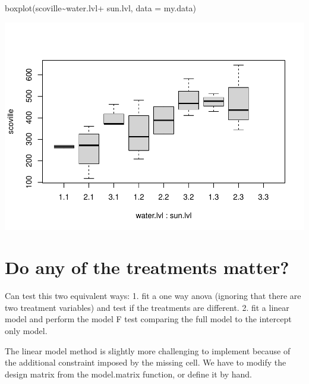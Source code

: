 \documentclass[
]{book}
\newenvironment{Shaded}{\begin{snugshade}}{\end{snugshade}}
\newcommand{\AttributeTok}[1]{\textcolor[rgb]{0.77,0.63,0.00}{#1}}
\newcommand{\FunctionTok}[1]{\textcolor[rgb]{0.00,0.00,0.00}{#1}}
\newcommand{\NormalTok}[1]{#1}
\newcommand{\SpecialCharTok}[1]{\textcolor[rgb]{0.00,0.00,0.00}{#1}}
\begin{document}
\begin{Shaded}
\begin{Highlighting}[]
\FunctionTok{boxplot}\NormalTok{(scoville}\SpecialCharTok{\textasciitilde{}}\NormalTok{water.lvl}\SpecialCharTok{+}\NormalTok{ sun.lvl, }\AttributeTok{data =}\NormalTok{ my.data)}
\end{Highlighting}
\end{Shaded}

\includegraphics{10-MissingCellsInTwoWay_files/figure-latex/unnamed-chunk-3-2.pdf}

\hypertarget{do-any-of-the-treatments-matter}{%
\section{Do any of the treatments matter?}\label{do-any-of-the-treatments-matter}}

Can test this two equivalent ways:
1. fit a one way anova (ignoring that there are two treatment variables) and test if the treatments are different.
2. fit a linear model and perform the model F test comparing the full model to the intercept only model.

The linear model method is slightly more challenging to implement because of the additional constraint imposed by the missing cell. We have to modify the design matrix from the model.matrix function, or define it by hand.
\end{document}
